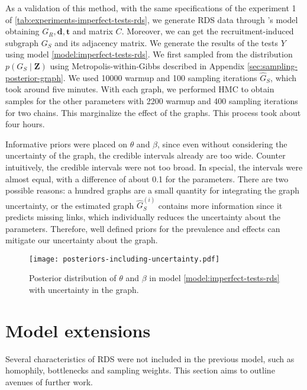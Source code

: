 As a validation of this method, with the same specifications of the experiment
1 of \autoref{tab:experiments-imperfect-tests-rds}, we generate RDS data
through \textcite{crawford2016}'s model obtaining $G_R, \boldsymbol{d},
\boldsymbol{t}$ and matrix $C$. Moreover, we can get the recruitment-induced
subgraph $G_S$ and its adjacency matrix. We generate the results of the tests
$Y$ using model \eqref{model:imperfect-tests-rds}. We first sampled from the
distribution $p(G_S \mid \boldsymbol{Z})$ using Metropolis-within-Gibbs
described in Appendix \ref{sec:sampling-posterior-graph}. We used 10000 warmup
and 100 sampling iterations $\hat{G}_S$, which took around five minutes. With each
graph, we performed HMC to obtain samples for the other parameters with 2200
warmup and 400 sampling iterations for two chains. This marginalize the
effect of the graphs. This process took about four hours. 

Informative priors
were placed on $\theta$ and $\beta$, since even without considering the
uncertainty of the graph, the credible intervals already are too wide. Counter
intuitively, the credible intervals were not too broad. In special, the intervals were
almost equal, with a difference of about 0.1 for the parameters. There are two
possible reasons: a hundred graphs are a small quantity for integrating the
graph uncertainty, or the estimated graph $\hat{G}_S^{(i)}$ contains more
information since it predicts missing links, which individually reduces the
uncertainty about the parameters. Therefore, well defined
priors for the prevalence and effects can mitigate our uncertainty about the graph. 

\begin{figure}[htbp]
  \centering
  \caption{\label{fig:posteriors-including-uncertainty}Posterior distribution
  of $\theta$ and $\beta$ in model \eqref{model:imperfect-tests-rds} with
  uncertainty in the graph.}
  \texttt{[image: posteriors-including-uncertainty.pdf]}
\end{figure}

\section{Model extensions}
\label{sec:model_extensions}

Several characteristics of RDS were not included in the previous model, such as
homophily, bottlenecks and sampling weights. This section aims to outline
avenues of further work.

